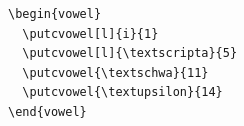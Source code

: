 \begin{frame}[fragile]
\begin{columns}
\begin{column}{.35\textwidth}
\end{column}
	
\end{columns}



\begin{columns}

\begin{column}{.65\textwidth}
{\footnotesize
\begin{lstlisting}
\begin{vowel}
  \putcvowel[l]{i}{1}
  \putcvowel[l]{\textscripta}{5}
  \putcvowel{\textschwa}{11}
  \putcvowel{\textupsilon}{14}
\end{vowel}
\end{lstlisting}
}

\end{column}
\begin{column}{.35\textwidth}

\begin{vowel}
\end{vowel}
	
\end{column}

\end{columns}

\end{frame}


